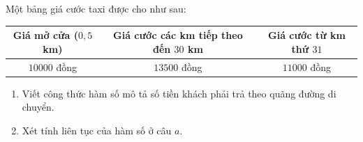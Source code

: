 \begin{bt}%
	Một bảng giá cước taxi được cho như sau:
	\begin{center}
		\begin{tabular}{|c|c|c|}
			\hline
			Giá mở cửa ($0{,}5$ km) & Giá cước các km tiếp theo đến $30$ km & Giá cước từ km thứ $31$ \\
			\hline
			$10000$ đồng & $13500$ đồng & $11000$ đồng \\
			\hline
		\end{tabular}
	\end{center}
	\begin{enumerate}
		\item Viết công thức hàm số mô tả số tiền khách phải trả theo quãng đường di chuyển.
		\item Xét tính liên tục của hàm số ở câu $a$.
	\end{enumerate}
\end{bt}

